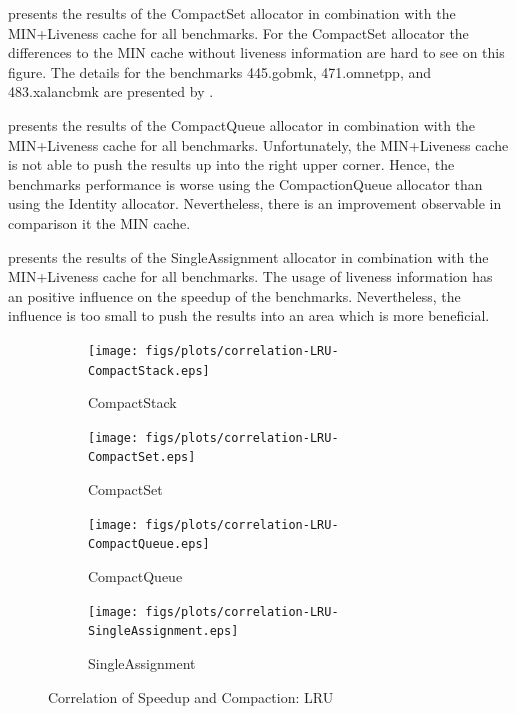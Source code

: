 \documentclass[onecolumn, openright, master, english, signatures]{dbrgrptt}
\begin{document}
 presents the results of the CompactSet allocator in combination with the \ac{MIN}+Liveness cache for all benchmarks.
For the CompactSet allocator the differences to the \ac{MIN} cache without liveness information are hard to see on this figure.
The details for the benchmarks 445.gobmk, 471.omnetpp, and 483.xalancbmk are presented by .

 presents the results of the CompactQueue allocator in combination with the \ac{MIN}+Liveness cache for all benchmarks.
Unfortunately, the \ac{MIN}+Liveness cache is not able to push the results up into the right upper corner.
Hence, the benchmarks performance is worse using the CompactionQueue allocator than using the Identity allocator.
Nevertheless, there is an improvement observable in comparison it the \ac{MIN} cache.

 presents the results of the SingleAssignment allocator in combination with the \ac{MIN}+Liveness cache for all benchmarks.
The usage of liveness information has an positive influence on the speedup of the benchmarks.
Nevertheless, the influence is too small to push the results into an area which is more beneficial.

\begin{figure}[!ht]
  \begin{subfigure}[b]{0.5\textwidth}%
    \texttt{[image: figs/plots/correlation-LRU-CompactStack.eps]}
    \caption{CompactStack}
    \label{fig:correlation-lru-compactstack}
  \end{subfigure}%
  \begin{subfigure}[b]{0.5\textwidth}%
    \texttt{[image: figs/plots/correlation-LRU-CompactSet.eps]}
    \caption{CompactSet}
    \label{fig:correlation-lru-compactset}
  \end{subfigure}%
  \qquad
  \begin{subfigure}[b]{0.5\textwidth}%
    \texttt{[image: figs/plots/correlation-LRU-CompactQueue.eps]}
    \caption{CompactQueue}
    \label{fig:correlation-lru-compactqueue}
  \end{subfigure}%
  \begin{subfigure}[b]{0.5\textwidth}%
    \texttt{[image: figs/plots/correlation-LRU-SingleAssignment.eps]}
    \caption{SingleAssignment}
    \label{fig:correlation-lru-singleassignment}
  \end{subfigure}%
  \caption{Correlation of Speedup and Compaction: LRU}
  \label{fig:correlation-lru}
\end{figure}
\end{document}
